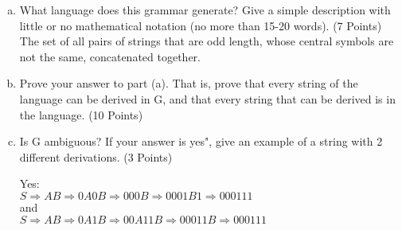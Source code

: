 \documentclass{article}
\begin{document}
\begin{enumerate}[(a)]
\item What language does this grammar generate? Give a simple description with little
or no mathematical notation (no more than 15-20 words). (7 Points) \\
The set of all pairs of strings that are odd length, whose central symbols are not the same, concatenated together.

\item Prove your answer to part (a). That is, prove that every string of the language
can be derived in G, and that every string that can be derived is in the language. (10 Points)

\item Is G ambiguous? If your answer is yes", give an example of a string with 2
different derivations. (3 Points)

Yes: \\
$S \Rightarrow AB \Rightarrow 0A0B \Rightarrow 000B \Rightarrow
0001B1 \Rightarrow 000111$ \\
and \\
$S \Rightarrow AB \Rightarrow 0A1B \Rightarrow 00A11B \Rightarrow
00011B \Rightarrow 000111$
\end{enumerate}
\end{document}
